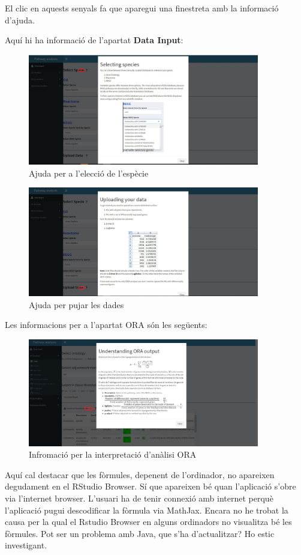 \documentclass[]{article}
\begin{document}
El clic en aquests senyals fa que aparegui una finestreta amb la informació d'ajuda.

Aquí hi ha informació de l'apartat \textbf{Data Input}:

\begin{figure}[H]
\centering
\includegraphics[width=0.9\textwidth]{Help_Specie.jpg} 
\caption{Ajuda per a l'elecció de l'espècie}
\end{figure}

\begin{figure}[H]
\centering
\includegraphics[width=0.9\textwidth]{Help_Upload_Data.jpg} 
\caption{Ajuda per pujar les dades}
\end{figure}

Les informacions per a l'apartat ORA són les següents:

\begin{figure}[H]
\centering
\includegraphics[width=0.9\textwidth]{Help_ORA_output.jpg} 
\caption{Infromació per la interpretació d'anàlisi ORA}
\end{figure}
Aquí cal destacar que les fòrmules, depenent de l'ordinador, no apareixen degudament en el RStudio Browser. Sí que apareixen bé quan l'aplicació s'obre via l’internet browser. L'usuari ha de tenir connexió amb internet perquè l'aplicació pugui descodificar la fòrmula via MathJax. Encara no he trobat la causa per la qual el Rstudio Browser en alguns ordinadors no visualitza bé les fòrmules. Pot ser un problema amb Java, que s'ha d'actualitzar? Ho estic investigant.
\end{document}

